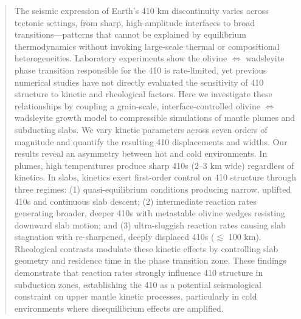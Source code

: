 \documentclass[draft,linenumbers]{agujournal2019}
\begin{document}
\begin{abstract}
The seismic expression of Earth's 410 km discontinuity varies across
tectonic settings, from sharp, high-amplitude interfaces to broad
transitions---patterns that cannot be explained by equilibrium
thermodynamics without invoking large-scale thermal or compositional
heterogeneities. Laboratory experiments show the olivine
\(\Leftrightarrow\) wadsleyite phase transition responsible for the 410
is rate-limited, yet previous numerical studies have not directly
evaluated the sensitivity of 410 structure to kinetic and rheological
factors. Here we investigate these relationships by coupling a
grain-scale, interface-controlled olivine \(\Leftrightarrow\) wadsleyite
growth model to compressible simulations of mantle plumes and subducting
slabs. We vary kinetic parameters across seven orders of magnitude and
quantify the resulting 410 displacements and widths. Our results reveal
an asymmetry between hot and cold environments. In plumes, high
temperatures produce sharp 410s (2--3 km wide) regardless of kinetics.
In slabs, kinetics exert first-order control on 410 structure through
three regimes: (1) quasi-equilibrium conditions producing narrow,
uplifted 410s and continuous slab descent; (2) intermediate reaction
rates generating broader, deeper 410s with metastable olivine wedges
resisting downward slab motion; and (3) ultra-sluggish reaction rates
causing slab stagnation with re-sharpened, deeply displaced 410s
(\(\lesssim\) 100 km). Rheological contrasts modulate these kinetic
effects by controlling slab geometry and residence time in the phase
transition zone. These findings demonstrate that reaction rates strongly
influence 410 structure in subduction zones, establishing the 410 as a
potential seismological constraint on upper mantle kinetic processes,
particularly in cold environments where disequilibrium effects are
amplified.
\end{abstract}
\end{document}
